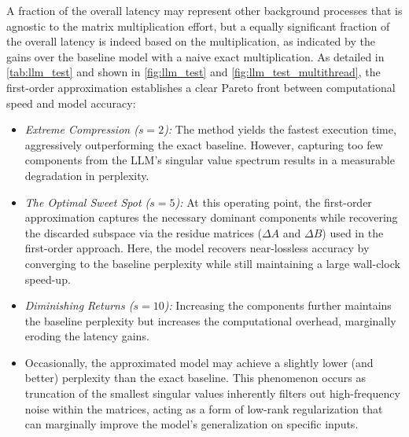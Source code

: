 \documentclass[onefignum,onetabnum]{siamart171218}
\newcommand{\DA}{\Delta\!A}
\newcommand{\DB}{\Delta\!B}
\begin{document}
A fraction of the overall latency may represent other background processes that is agnostic to the matrix multiplication effort, but a equally significant fraction of the overall latency is indeed based on the multiplication, as indicated by the gains over the baseline model with a naive exact multiplication. As detailed in \cref{tab:llm_test} and shown in \cref{fig:llm_test} and \cref{fig:llm_test_multithread}, the first-order approximation establishes a clear Pareto front between computational speed and model accuracy:
\begin{itemize}
    \item \textit{Extreme Compression ($s=2$):} The method yields the fastest execution time, aggressively outperforming the exact baseline. However, capturing too few components from the LLM's singular value spectrum results in a measurable degradation in perplexity.
    \item \textit{The Optimal Sweet Spot ($s=5$):} At this operating point, the first-order approximation captures the necessary dominant components while recovering the discarded subspace via the residue matrices ($\DA$ and $\DB$) used in the first-order approach. Here, the model recovers near-lossless accuracy by converging to the baseline perplexity while still maintaining a large wall-clock speed-up.
    \item \textit{Diminishing Returns ($s=10$):} Increasing the components further maintains the baseline perplexity but increases the computational overhead, marginally eroding the latency gains.
    \item Occasionally, the approximated model may achieve a slightly lower (and better) perplexity than the exact baseline. This phenomenon occurs as truncation of the smallest singular values inherently filters out high-frequency noise within the matrices, acting as a form of low-rank regularization that can marginally improve the model's generalization on specific inputs.
\end{itemize}
\end{document}
